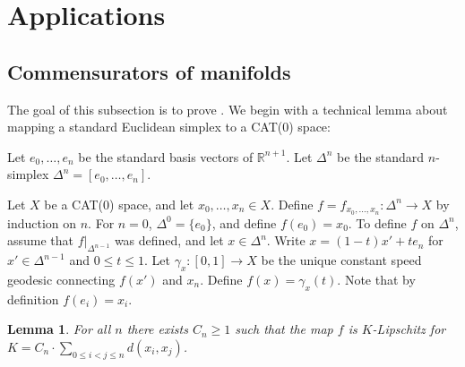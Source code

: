 \documentclass{amsart}
\numberwithin{equation}{section}
\newtheorem{lemma}[theorem]{Lemma}
\theoremstyle{definition}
\newcommand{\bbR}{\mathbb{R}}
\newcommand{\tild}[1]{\widetilde{#1}}
\newcommand{\bdelta}{{\boldsymbol\delta}}
\begin{document}
\section{Applications}
\label{sec: applications}

\subsection{Commensurators of manifolds}
    The goal of this subsection is to prove . 
    We begin with a technical lemma about mapping a standard Euclidean simplex to a CAT(0) space:

    Let $e_0,\dots,e_n$ be the standard basis vectors of $\bbR^{n+1}$. Let $\Delta^n$ be the standard $n$-simplex $\Delta^n=[e_0,\dots,e_n]$.

    Let $X$ be a CAT(0) space, and let $x_0,\dots,x_n\in X$.
    Define $f=f_{x_0,\dots,x_n}:\Delta^n\to X$ by induction on $n$. For $n=0$, $\Delta^0=\{e_0\}$, and define $f(e_0)=x_0$.
    To define $f$ on $\Delta^n$, assume that $f|_{\Delta^{n-1}}$ was defined, and let $x\in \Delta^n$. Write $x=(1-t)x'+t e_n$ for $x'\in \Delta^{n-1}$ and $0\le t\le 1$. Let $\gamma_x:[0,1]\to X$ be the unique constant speed geodesic connecting $f(x')$ and $x_n$. Define $f(x)=\gamma_x(t)$.
    Note that by definition $f(e_i)=x_i$.
    
\begin{lemma}\label{lemma: Lipschitz on simplex}
    For all $n$ there exists $C_n\ge 1$ such that the map $f$ is $K$-Lipschitz for $K=C_n\cdot \sum_{0\le i<j\le n} d(x_i,x_j)$. 
\end{lemma}
\end{document}
